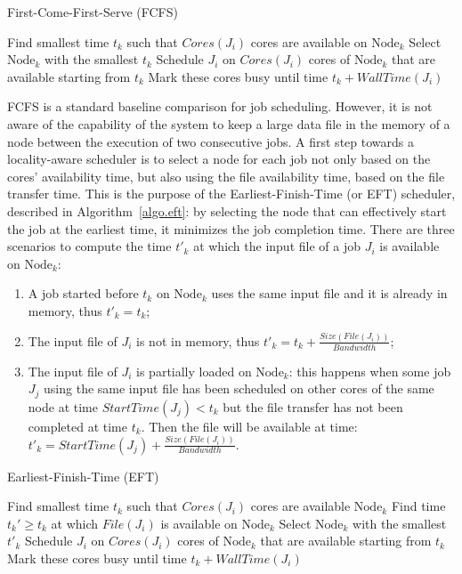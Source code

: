 \documentclass[conference]{IEEEtran}
\newcommand{\Node}[1]{\ensuremath{\mathrm{Node}_{#1}}\xspace}
\newcommand{\file}{\ensuremath{\mathit{File}}\xspace}
\newcommand{\size}{\ensuremath{\mathit{Size}}\xspace}
\newcommand{\bandwidth}{\mathit{Bandwidth}\xspace}
\newcommand{\core}{\mathit{Cores}\xspace}
\newcommand{\walltime}{\mathit{WallTime}\xspace}
\newcommand{\start}{\mathit{StartTime}\xspace}
\newcommand{\nodeset}{\ensuremath{\mathbb{N}}\xspace}
\begin{document}
\begin{algorithm}[htbp]%
\caption{First-Come-First-Serve (FCFS)}\label{algo.fcfs}
\begin{algorithmic}[1]
        \ForEach{$\Node{k} \in \nodeset$}
        \State Find smallest time $t_k$ such that $\core(J_i)$ cores are available on \Node{k}\label{fcfs.ln.find}
        \EndFor
        \State Select \Node{k}  with the smallest $t_k$
        \State Schedule $J_i$ on $\core(J_i)$ cores of \Node{k} that are available starting from $t_k$
        \State Mark these cores busy until time $t_k +\walltime(J_i)$
	\EndFor
	\end{algorithmic}
\end{algorithm}


FCFS is a standard baseline comparison
for job scheduling. However, it is not aware of the capability of the
system to keep a large data file in the memory of a node between the execution of
two consecutive jobs.
A first step towards a locality-aware scheduler
is to select a node for each job not only based on the cores' availability
time, but also using the file availability time, based on the file
transfer time. This is the purpose of the Earliest-Finish-Time (or
EFT) scheduler, described in Algorithm~\ref{algo.eft}: by selecting
the node that can effectively start the job at the earliest time, it
minimizes the job completion time. There are three scenarios to compute the
time $t'_k$ at which the input file of a job $J_i$ is available on
\Node{k}:
\begin{enumerate}
\item A job started before $t_k$ on \Node{k} uses the same input
  file and it is already in memory, thus $t'_k=t_k$;
\item The input file of $J_i$ is not in memory, thus
  $t'_k=t_k+\frac{\size(\file(J_i))}{\bandwidth}$;
\item The input file of $J_i$ is partially loaded on \Node{k}: this
  happens when some
  job $J_j$ using the same input file has been scheduled on other cores of
  the same node at time $\start(J_j)<t_k$ but the file transfer has not been
  completed at time $t_k$. Then the file will be available at time:
  $t'_k = \start(J_j)+\frac{\size(\file(J_i))}{\bandwidth}.$
\end{enumerate}

		
\begin{algorithm}[htbp]%
\caption{Earliest-Finish-Time (EFT)}\label{algo.eft}
\begin{algorithmic}[1]
		\ForEach{$\Node{k} \in \nodeset$}
			\State Find smallest time $t_k$ such that $\core(J_i)$ cores are available \Node{k}
			\State Find time $t_k' \geq t_k$ at which $\file(J_i)$ is available on $\Node{k}$ 
		\EndFor
                \State Select \Node{k}  with the smallest $t'_k$
                \State Schedule $J_i$ on $\core(J_i)$ cores of \Node{k} that are available starting from $t_k$
                \State Mark these cores busy until time $t_k +\walltime(J_i)$
	\EndFor
\end{algorithmic}
\end{algorithm}
\end{document}
